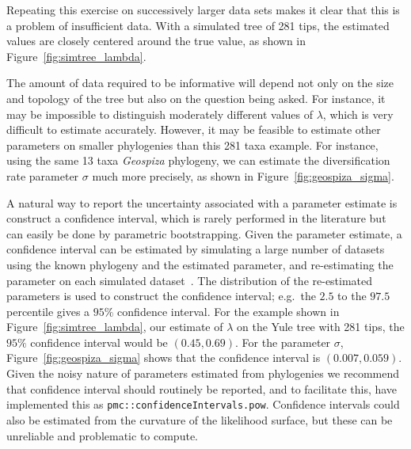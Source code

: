 Repeating this exercise on successively larger data sets makes it clear that this is a problem of insufficient data.  
With a simulated tree of 281 tips,
the estimated values are closely centered around the true value, as shown in Figure~\ref{fig:simtree_lambda}.  


The amount of data required to be informative will depend
not only on the size and topology of the tree but also on the question being asked.  
For instance, it may be impossible to distinguish moderately different values of $\lambda$, 
which is very difficult to estimate accurately.
However, it may be feasible to estimate other parameters on smaller phylogenies than this 281 taxa example.
For instance, 
using the same 13 taxa {\it Geospiza} phylogeny, 
we can estimate the diversification rate parameter $\sigma$ much more precisely, 
as shown in Figure~\ref{fig:geospiza_sigma}.

A natural way to report the uncertainty associated with a parameter estimate 
is construct a confidence interval,
which is rarely performed in the literature but
can easily be done by parametric bootstrapping.
Given the parameter estimate, a confidence interval can be estimated by 
simulating a large number of datasets using the known phylogeny and the estimated parameter, 
and re-estimating the parameter on each simulated dataset~\citep[\emph{e.g.} see][]{Diciccio1996}.
The distribution of the re-estimated parameters is used to construct the confidence interval;
e.g.\ the $2.5$ to the $97.5$ percentile gives a $95\%$ confidence interval.
For the example shown in Figure~\ref{fig:simtree_lambda}, our estimate of $\lambda$ on the Yule tree with 281 tips,
the $95\%$ confidence interval would be $(0.45, 0.69)$.  
For the parameter $\sigma$, Figure~\ref{fig:geospiza_sigma} shows that the confidence interval is $(0.007, 0.059)$.
Given the noisy nature of parameters estimated from phylogenies we recommend that confidence interval should routinely be reported,
and to facilitate this, have implemented this as \texttt{pmc::confidenceIntervals.pow}.
Confidence intervals could also be estimated from the curvature of the likelihood surface, 
but these can be unreliable and problematic to compute.  





